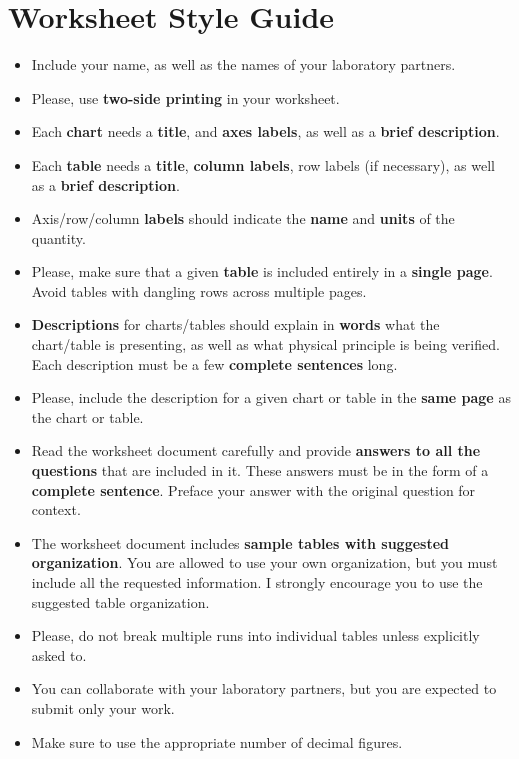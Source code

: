 \setcounter{chapter}{1}
\chapter{Worksheet Style Guide}
%
\begin{itemize}
    \item Include your name, as well as the names of your laboratory partners.
    \item Please, use \textbf{two-side printing} in your worksheet.
    \item Each \textbf{chart} needs a \textbf{title}, and \textbf{axes labels}, as well as a \textbf{brief description}.
    \item Each \textbf{table} needs a \textbf{title}, \textbf{column labels}, row labels (if necessary), as well as a \textbf{brief description}.
    \item Axis/row/column \textbf{labels} should indicate the \textbf{name} and \textbf{units} of the quantity.
    \item Please, make sure that a given \textbf{table} is included entirely in a \textbf{single page}. Avoid tables with dangling rows across multiple pages.
    \item \textbf{Descriptions} for charts/tables should explain in \textbf{words} what the chart/table is presenting, as well as what physical principle is being verified. Each description must be a few \textbf{complete sentences} long.
    \item Please, include the description for a given chart or table in the \textbf{same page} as the chart or table.
    \item Read the worksheet document carefully and provide \textbf{answers to all the questions} that are included in it. These answers must be in the form of a \textbf{complete sentence}. Preface your answer with the original question for context.
    \item The worksheet document includes \textbf{sample tables with suggested organization}. You are allowed to use your own organization, but you must include all the requested information. I strongly encourage you to use the suggested table organization.
    \item Please, do not break multiple runs into individual tables unless explicitly asked to.
    \item You can collaborate with your laboratory partners, but you are expected to submit only your work.
    \item Make sure to use the appropriate number of decimal figures.
\end{itemize}
%
